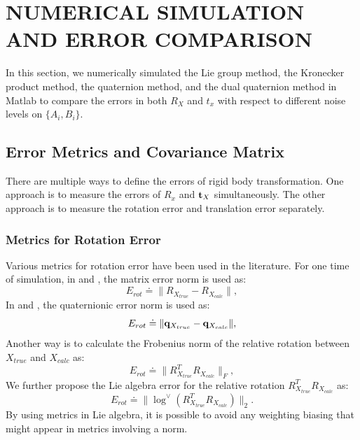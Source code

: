 \documentclass[twocolumn,10pt]{asme2ej}
\begin{document}
\section{NUMERICAL SIMULATION AND ERROR COMPARISON}
\label{qianli-numerical}

In this section, we numerically simulated the Lie group method, the Kronecker product method, the quaternion method, and the dual quaternion method in Matlab  to compare the errors in both $R_{X}$ and $t_{x}$ with respect to different noise levels on $\{A_{i}, B_{i}\}$. 

\subsection{Error Metrics and Covariance Matrix}
There are multiple ways to define the errors of rigid body transformation. One approach is to measure the errors of $R_{x}$ and ${\bf t}_{X}$ simultaneously. The other approach is to measure the rotation error and translation error separately. 
\subsubsection{Metrics for Rotation Error}
Various metrics for rotation error have been used in the literature. For one time of simulation, in \cite{tsai1989new} and \cite{horaud1995hand}, the matrix error norm is used as: 
\begin{equation}
E_{rot} \doteq \| R_{X_{true}} - R_{X_{calc}} \|,
\end{equation}
In \cite{daniilidis1999hand} and \cite{andreff1999line}, the quaternionic error norm is used as:
\begin{equation}
E_{rot} \doteq \|{\bf q}_{X_{true}} - {\bf q}_{X_{calc}}\|,
\end{equation}
Another way is to calculate the Frobenius norm of the relative rotation between $X_{true}$ and $X_{calc}$ as:
\begin{equation}
E_{rot} \doteq \|R^{T}_{X_{true}}R_{X_{calc}}\|_{F},
\end{equation} 
We further propose the Lie algebra error for the relative rotation $R^{T}_{X_{true}}R_{X_{calc}}$ as:
\begin{equation} 
E_{rot} \doteq \|\log^{\vee}(R_{X_{true}}^TR_{X_{calc}})\|_{2}.
\label{RotError}
\end{equation}
By using metrics in Lie algebra, it is possible to avoid any weighting biasing that might appear in metrics involving a norm. 
\end{document}
